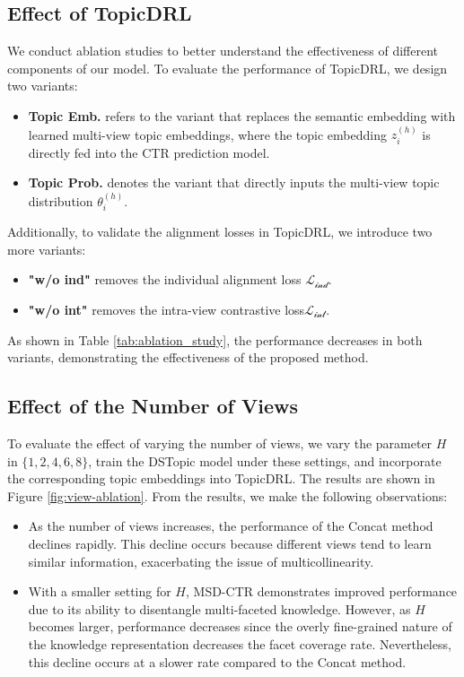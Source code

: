 \subsection{Effect of TopicDRL}
We conduct ablation studies to better understand the effectiveness of different components of our model. To evaluate the performance of TopicDRL, we design two variants:
\begin{itemize}
    \item \textbf{Topic Emb.} refers to the variant that replaces the semantic embedding with learned multi-view topic embeddings, where the topic embedding \( z^{(h)}_i \) is directly fed into the CTR prediction model.
    \item \textbf{Topic Prob.} denotes the variant that directly inputs the multi-view topic distribution \( \theta^{(h)}_i \).
\end{itemize}
Additionally, to validate the alignment losses in TopicDRL, we introduce two more variants:
\begin{itemize}
    \item \textbf{"w/o ind"} removes the individual alignment loss $\mathcal{L_{\text{ind}}}$.
    \item \textbf{"w/o int"} removes the intra-view contrastive loss$\mathcal{L_{\text{int}}}$.
\end{itemize}
As shown in Table \ref{tab:ablation_study}, the performance decreases in both variants, demonstrating the effectiveness of the proposed method.

\subsection{Effect of the Number of Views}
To evaluate the effect of varying the number of views, we vary the parameter \( H \) in \( \{1, 2, 4, 6, 8\} \), train the DSTopic model under these settings, and incorporate the corresponding topic embeddings into TopicDRL. The results are shown in Figure \ref{fig:view-ablation}. From the results, we make the following observations:
\begin{itemize}
    \item As the number of views increases, the performance of the Concat method declines rapidly. This decline occurs because different views tend to learn similar information, exacerbating the issue of multicollinearity.
    \item With a smaller setting for \( H \), MSD-CTR demonstrates improved performance due to its ability to disentangle multi-faceted knowledge. However, as \( H \) becomes larger, performance decreases since the overly fine-grained nature of the knowledge representation decreases the facet coverage rate. Nevertheless, this decline occurs at a slower rate compared to the Concat method.
\end{itemize}

